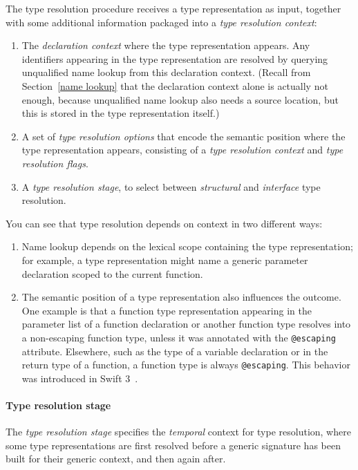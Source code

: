 \documentclass[../generics]{subfiles}
\begin{document}
The type resolution procedure receives a type representation as input, together with some additional information packaged into a \emph{type resolution context}:
\begin{enumerate}
\item The \emph{declaration context} where the type representation appears. Any identifiers appearing in the type representation are resolved by querying unqualified name lookup from this declaration context. (Recall from Section~\ref{name lookup} that the declaration context alone is actually not enough, because unqualified name lookup also needs a source location, but this is stored in the type representation itself.)
\item A set of \emph{type resolution options} that encode the semantic position where the type representation appears, consisting of a \emph{type resolution context} and \emph{type resolution flags}.
\item A \emph{type resolution stage}, to select between \emph{structural} and \emph{interface} type resolution.
\end{enumerate}
You can see that type resolution depends on context in two different ways:
\begin{enumerate}
\item Name lookup depends on the lexical scope containing the type representation; for example, a type representation might name a generic parameter declaration scoped to the current function.
\item The semantic position of a type representation also influences the outcome. One example is that a function type representation appearing in the parameter list of a function declaration or another function type resolves into a non-escaping function type, unless it was annotated with the \texttt{@escaping} attribute. Elsewhere, such as the type of a variable declaration or in the return type of a function, a function type is always \texttt{@escaping}. This behavior was introduced in Swift 3~\cite{se0103}.
\end{enumerate}

\paragraph{Type resolution stage}
%
%
%
%
The \emph{type resolution stage} specifies the \emph{temporal} context for type resolution, where some type representations are first resolved before a generic signature has been built for their generic context, and then again after.
\end{document}
